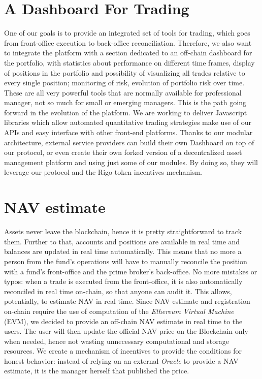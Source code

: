\documentclass[9pt,oneside]{amsart}
\begin{document}
\begin{multicols}{2}
\section{A Dashboard For Trading} \label{ch:model}
One of our goals is to provide an integrated set of tools for trading, which goes from front-office execution to back-office reconciliation. Therefore, we also want to integrate the platform with a section dedicated to an off-chain dashboard for the portfolio, with statistics about performance on different time frames, display of positions in the portfolio and possibility of visualizing all trades relative to every single position; monitoring of risk, evolution of portfolio risk over time. These are all very powerful tools that are normally available for professional manager, not so much for small or emerging managers. This is the path going forward in the evolution of the platform.
We are working to deliver Javascript libraries which allow automated quantitative trading strategies make use of our APIs and easy interface with other front-end platforms.
Thanks to our modular architecture, external service providers can build their own Dashboard on top of our protocol, or even create their own forked version of a decentralized asset management platform and using just some of our modules. By doing so, they will leverage our protocol and the Rigo token incentives mechanism.

\section{NAV estimate} \label{ch:ghost}

Assets never leave the blockchain, hence it is pretty straightforward to track them. Further to that, accounts and positions are available in real time and balances are updated in real time automatically. This means that no more a person from the fund's operations will have to manually reconcile the position with a fund's front-office and the prime broker's back-office. No more mistakes or typos: when a trade is executed from the front-office, it is also automatically reconciled in real time on-chain, so that anyone can audit it. This allows, potentially, to estimate NAV in real time.
Since NAV estimate and registration on-chain require the use of computation of the \textit{Ethereum Virtual Machine} (EVM), we decided to provide an off-chain NAV estimate in real time to the users. The user will then update the official NAV price on the Blockchain only when needed, hence not wasting unnecessary computational and storage resources. We create a mechanism of incentives to provide the conditions for honest behavior: instead of relying on an external \textit{Oracle} to provide a NAV estimate, it is the manager herself that published the price.


\end{multicols}
\end{document}
